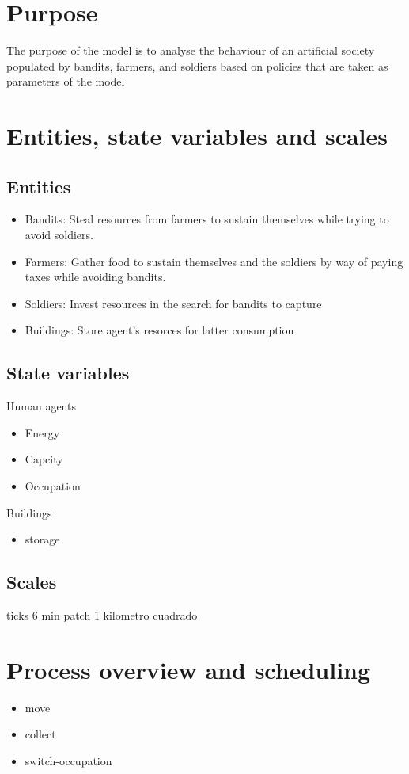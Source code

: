 \documentclass{article}
\begin{document}
\section{Purpose}

The purpose of the model is to analyse the behaviour of an artificial society
populated by bandits, farmers, and soldiers based on policies that are taken
as parameters of the model

\section{Entities, state variables and scales}
\subsection{Entities}
\begin{itemize}
\item Bandits: Steal resources from farmers to sustain themselves while trying
  to avoid soldiers.
\item Farmers: Gather food to sustain themselves and the soldiers by way
  of paying taxes while avoiding bandits.
\item Soldiers: Invest resources in the search for bandits to capture
\item Buildings: Store agent's resorces for latter consumption
\end{itemize}

\subsection{State variables}
Human agents
\begin{itemize}
\item Energy
\item Capcity
\item Occupation
\end{itemize}

Buildings
\begin{itemize}
\item storage
\end{itemize}

\subsection{Scales}
ticks 6 min
patch 1 kilometro cuadrado

\section{Process overview and scheduling}
\begin{itemize}
\item move
\item collect
\item switch-occupation
\end{itemize}
\end{document}
